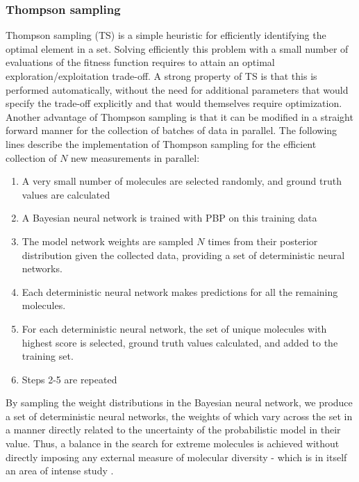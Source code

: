 \subsubsection{Thompson sampling}

Thompson sampling (TS) \cite{Thompson_1933} is a simple heuristic for efficiently identifying the optimal element in a set. Solving efficiently this problem with a small number of evaluations of the fitness function requires to attain an optimal exploration/exploitation trade-off. A strong property of TS  is that this is performed automatically, without the need for additional parameters that would specify the trade-off explicitly and that would themselves require optimization. Another advantage of Thompson sampling is that it can be modified in a straight forward manner for the collection of batches of data in parallel. The following lines describe the implementation of Thompson sampling for the efficient collection of $N$ new measurements in parallel:
\begin{enumerate}
\item A very small number of molecules are selected randomly, and ground truth values are calculated
\item A Bayesian neural network is trained with PBP on this training data
\item The model network weights are sampled $N$ times from their posterior distribution given the collected data, providing a set of deterministic neural networks.
\item Each deterministic neural network makes predictions for all the remaining molecules.
\item For each deterministic neural network, the set of unique molecules with highest score is selected, ground truth values calculated, and added to the training set.
\item Steps 2-5 are repeated
\end{enumerate}
By sampling the weight distributions in the Bayesian neural network, we produce a set of deterministic neural networks, the weights of which vary across the set in a manner directly related to the uncertainty of the probabilistic model in their value.  Thus, a balance in the search for extreme molecules is achieved without directly imposing any external measure of molecular diversity - which is in itself an area of intense study \cite{Maldonado_2006}.